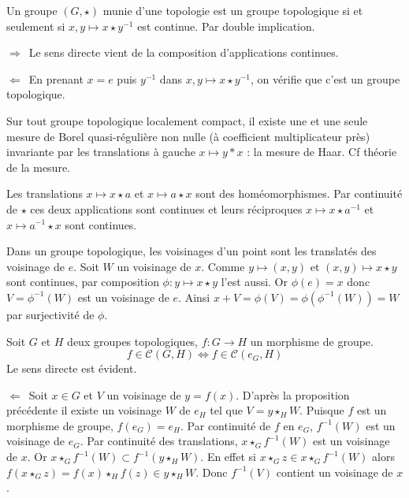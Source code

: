 \documentclass[a4paper, 11pt, french]{book}
\theoremstyle{plain} %
\theoremstyle{definition} %
\theoremstyle{remark} %
\newcommand\impldir{$\boxed{\Rightarrow}$\ }
\newcommand\implrec{$\boxed{\Leftarrow}$\ }
\newcommand{\1}{\mathds{1}}
\newcommand{\cont}{\mathcal{C}}
\newcommand{\inv}[1]{#1^{-1}}
\begin{document}
\proposition
Un groupe $(G, \star)$ munie d'une topologie est un groupe topologique si et seulement si $x, y\longmapsto x\star\inv{y}$ est continue.
\demonstration Par double implication.

\impldir Le sens directe vient de la composition d'applications continues.

\implrec En prenant $x=e$ puis $\inv{y}$ dans $x, y\longmapsto x\star\inv{y}$, on vérifie que c'est un groupe topologique.


Sur tout groupe topologique localement compact, il existe une et une seule mesure de Borel quasi-régulière non nulle (à coefficient multiplicateur près) invariante par les translations à gauche $x\longmapsto y*x$ : la mesure de Haar.
\demonstration
Cf théorie de la mesure.

\proposition
Les translations $x\longmapsto x\star a$ et $x\longmapsto a\star x$ sont des homéomorphismes.
\demonstration
Par continuité de $\star$ ces deux applications sont continues et leurs réciproques $x\longmapsto x\star\inv{a}$ et $x\longmapsto\inv{a}\star x$ sont continues.

\proposition
Dans un groupe topologique, les voisinages d’un point sont les translatés des voisinage de $e$.
\demonstration
Soit $W$ un voisinage de $x$.
Comme $y\longmapsto(x, y)$ et $(x, y)\longmapsto x\star y$ sont continues, par composition $\phi:y\longmapsto x\star y$ l'est aussi.
Or $\phi(e)=x$ donc $V=\inv{\phi}(W)$ est un voisinage de $e$.
Ainsi $x+V=\phi(V)=\phi(\inv{\phi}(W))=W$ par surjectivité de $\phi$.

\proposition
Soit $G$ et $H$ deux groupes topologiques, $f:G\rightarrow H$ un morphisme de groupe.
$$
f\in\cont(G, H)\iff f\in\cont(e_G, H)
$$
\demonstration Le sens directe est évident.

\implrec Soit $x\in G$ et $V$ un voisinage de $y=f(x)$.
D'après la proposition précédente il existe un voisinage $W$ de $e_H$ tel que $V=y\star_HW$.
Puisque $f$ est un morphisme de groupe, $f(e_G)=e_H$.
Par continuité de $f$ en $e_G$, $\inv{f}(W)$ est un voisinage de $e_G$.
Par continuité des translations, $x\star_G\inv{f}(W)$ est un voisinage de $x$.
Or $x\star_G\inv{f}(W)\subset\inv{f}(y\star_HW)$.
En effet si $x\star_Gz\in x\star_G\inv{f}(W)$ alors $f(x\star_Gz)=f(x)\star_Hf(z)\in y\star_HW$.
Donc $\inv{f}(V)$ contient un voisinage de $x$.
\end{document}
